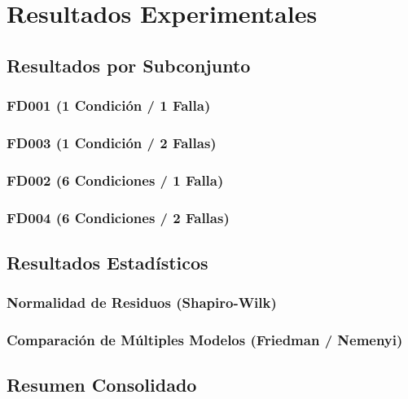 
\chapter{Resultados Experimentales}

\section{Resultados por Subconjunto}
\subsection{FD001 (1 Condición / 1 Falla)}
\subsection{FD003 (1 Condición / 2 Fallas)}
\subsection{FD002 (6 Condiciones / 1 Falla)}
\subsection{FD004 (6 Condiciones / 2 Fallas)}

\section{Resultados Estadísticos}
\subsection{Normalidad de Residuos (Shapiro-Wilk)}
\subsection{Comparación de Múltiples Modelos (Friedman / Nemenyi)}

\section{Resumen Consolidado}
